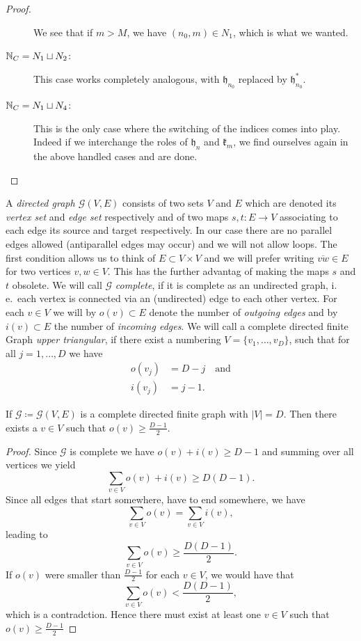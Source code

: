 \begin{proof}
\begin{description}
    We see that if \(m > M\), we have \((n_0, m) \in N_1\), which is what we wanted.
  \item[\(\mathbb{N}_C = N_1 \sqcup N_2\):] This case works completely analogous, with \(\mathfrak{h}_{n_0}\) replaced by \(\mathfrak{h}_{n_0}^\ast\).
  \item[\(\mathbb{N}_C = N_1 \sqcup N_4\):] This is the only case where the switching of the indices comes into play. Indeed if we interchange the roles of \(\mathfrak{h}_n\) and \(\mathfrak{k}_m\), we find ourselves again in the above handled cases and are done.
  \end{description}
\end{proof}

\begin{defin}
  A \emph{directed graph \(\mathcal{G}(V,E)\)} consists of two sets \(V\) and \(E\) which are denoted its \emph{vertex set} and \emph{edge set} respectively and of two maps \(s, t \colon E \to V\) associating to each edge its source and target respectively. In our case there are no parallel edges allowed (antiparallel edges may occur) and we will not allow loops. The first condition allows us to think of \(E \subset V \times V\) and we will prefer writing \(\overline{vw} \in E\) for two vertices \(v,w \in V\). This has the further advantag of making the maps \(s\) and \(t\) obsolete. We will call \(\mathcal{G}\) \emph{complete}, if it is complete as an undirected graph, i.\,e.\ each vertex is connected via an (undirected) edge to each other vertex. For each \(v \in V\) we will by \(o(v) \subset E\) denote the number of \emph{outgoing edges} and by \(i(v) \subset E\) the number of \emph{incoming edges}. We will call a complete directed finite Graph \emph{upper triangular}, if there exist a numbering \(V = \{v_1, \dots, v_D\}\), such that for all \(j = 1, \dots, D\) we have
  \begin{align*}
    o(v_j) & = D - j\quad \text{and}\\
    i(v_j) & = j - 1.
  \end{align*}
\end{defin}

\begin{lemma}[{\cite[Lemma~A.6]{MR3509968}}]
  If \(\mathcal{G} \coloneqq \mathcal{G}(V,E)\) is a complete directed finite graph with \(|V| = D\). Then there exists a \(v \in V\) such that \(o(v) \geq \frac{D-1}{2}\).
\end{lemma}

\begin{proof}
  Since \(\mathcal{G}\) is complete we have \(o(v) + i(v) \geq D - 1\) and summing over all vertices we yield
  \[
    \sum_{v \in V} o(v) + i(v) \geq D(D-1).
  \]
  Since all edges that start somewhere, have to end somewhere, we have
  \[
    \sum_{v \in V} o(v) = \sum_{v \in V} i(v),
  \]
  leading to
  \[
    \sum_{v \in V} o(v) \geq \frac{D(D-1)}{2}.
  \]
  If \(o(v)\) were smaller than \(\frac{D-1}{2}\) for each \(v \in V\), we would have that
  \[
    \sum_{v \in V} o(v) < \frac{D(D-1)}{2},
  \]
  which is a contradction. Hence there must exist at least one \(v \in V\) such that \(o(v) \geq \frac{D-1}{2}\)
\end{proof}

